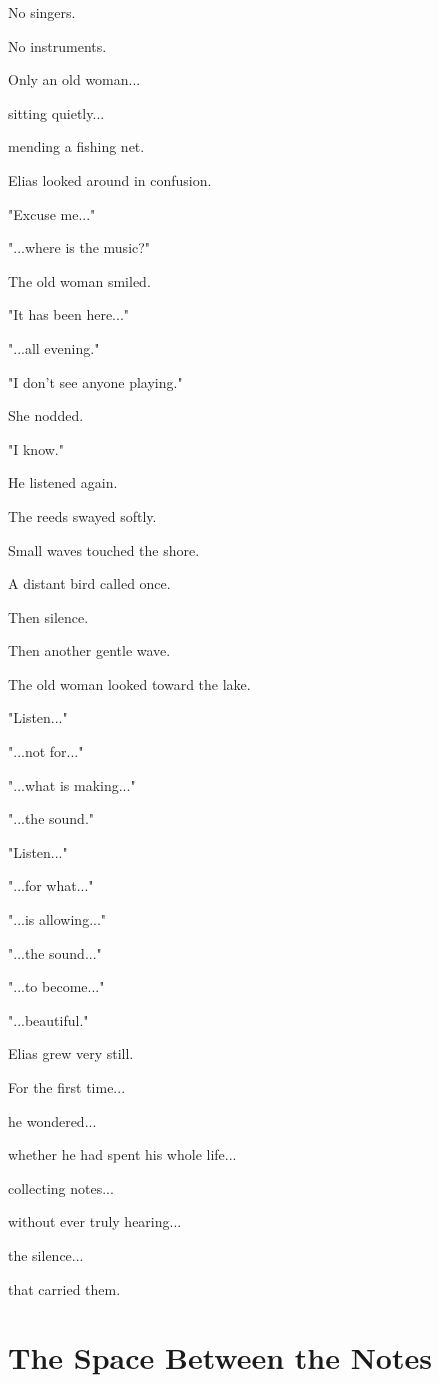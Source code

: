 \documentclass[12pt,openany]{book}
\begin{document}
No singers.

No instruments.

Only an old woman...

sitting quietly...

mending a fishing net.

Elias looked around in confusion.

"Excuse me..."

"...where is the music?"

The old woman smiled.

"It has been here..."

"...all evening."

"I don't see anyone playing."

She nodded.

"I know."

He listened again.

The reeds swayed softly.

Small waves touched the shore.

A distant bird called once.

Then silence.

Then another gentle wave.

The old woman looked toward the lake.

"Listen..."

"...not for..."

"...what is making..."

"...the sound."

"Listen..."

"...for what..."

"...is allowing..."

"...the sound..."

"...to become..."

"...beautiful."

Elias grew very still.

For the first time...

he wondered...

whether he had spent his whole life...

collecting notes...

without ever truly hearing...

the silence...

that carried them.
\section*{The Space Between the Notes}
\end{document}
